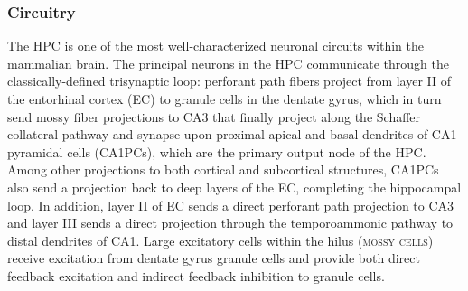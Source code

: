 \subsubsection{Circuitry}
The \ac{HPC} is one of the most well-characterized neuronal circuits within the mammalian brain.
The principal neurons in the \ac{HPC} communicate through the classically-defined trisynaptic loop: perforant path fibers project from layer II of the entorhinal cortex (EC) to granule cells in the dentate gyrus, which in turn send mossy fiber projections to CA3 that finally project along the Schaffer collateral pathway and synapse upon proximal apical and basal dendrites of CA1 pyramidal cells (CA1PCs), which are the primary output node of the \ac{HPC}.
Among other projections to both cortical and subcortical structures, CA1PCs also send a projection back to deep layers of the EC, completing the hippocampal loop.
In addition, layer II of EC sends a direct perforant path projection to CA3 and layer III sends a direct projection through the temporoammonic pathway to distal dendrites of CA1.
Large excitatory cells within the hilus (\textsc{mossy cells}) receive excitation from dentate gyrus granule cells and provide both direct feedback excitation and indirect feedback inhibition to granule cells.

